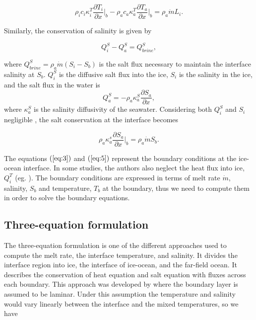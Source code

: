 \documentclass[11pt,a4paper]{article}
\begin{document}
		\begin{equation}
		\label{eq:3}
		    \rho_i c_i\kappa_i^T\dfrac{\partial T_i}{\partial x}\bigg|_b -\rho_a c_a\kappa_a^T\dfrac{\partial T_a}{\partial x}\bigg|_b = \rho_a \dot{m} L_i.
		\end{equation}
		
		\noindent Similarly, the conservation of salinity is given by
		
		\begin{equation}
			Q_i^S - Q_a^S = Q^S_{brine},
		\end{equation}
		
		\noindent where $Q_{brine}^S = \rho_a\dot{m}(S_i-S_b)$ is the salt flux necessary to maintain the interface salinity at $S_b$. $Q_i^S$ is the diffusive salt flux into the ice, $S_i$ is  the salinity in the ice, and the salt flux in the water is $$Q_a^S = -\rho_a\kappa_a^S\dfrac{\partial S_a}{\partial x},$$ 
		\noindent where $\kappa_a^S$ is  the salinity diffusivity of the seawater.
		Considering both $Q_i^S$ and $S_i$ negligible \citep{oerter1992evidence,gayen2016simulation}, the salt conservation at the interface becomes 
		
		\begin{equation}
			\label{eq:5}
			\rho_a\kappa_a^s\dfrac{\partial S_a}{\partial x}\bigg|_b = \rho_a\dot{m}S_b.
		\end{equation}
		
		\noindent The equations $(\ref{eq:3})$ and $(\ref{eq:5})$ represent the boundary conditions at the ice-ocean interface. In some studies, the authors also neglect the heat flux into ice, $Q_i^T$ (eg. \cite{gayen2016simulation}). The boundary conditions are expressed in terms of melt rate $\dot{m}$, salinity, $S_b$ and temperature, $T_b$ at the boundary, thus we need to compute them in order to solve the boundary equations.
	
	    \subsection{Three-equation formulation}
		
		The three-equation formulation is one of the different approaches used to compute the melt rate, the interface temperature, and salinity. It divides the interface region into ice, the interface of ice-ocean, and the far-field ocean. It describes the conservation of heat equation and salt equation with fluxes across each boundary. This approach was developed by \cite{holland1999modeling} where the boundary layer is assumed to be laminar. Under this assumption the temperature and salinity would vary linearly between the interface and the mixed temperatures, so we have
		
\end{document}
